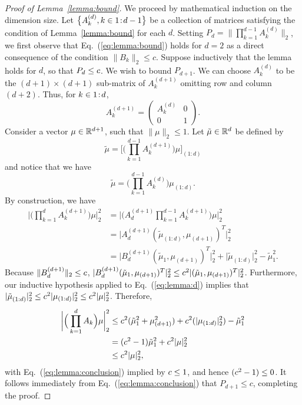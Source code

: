 \documentclass[12pt]{article}\usepackage[]{graphicx}\usepackage[]{xcolor}
\begin{document}
\begin{appendices}
\begin{proof}[Proof of Lemma~\ref{lemma:bound}]
We proceed by mathematical induction on the dimension size.
Let $\big\{A^{(d)}_k, k\in {1}\!:\!{d-1}\big\}$ be a collection of matrices satisfying the condition of Lemma~\ref{lemma:bound} for each $d$.
Setting $P_d=\big\|\prod_{k = 1}^{d-1} A^{(d)}_k \big\|_2$, we first observe that Eq.~(\ref{eq:lemma:bound}) holds for $d=2$ as a direct consequence of the condition $\|B_k\|_2 \leq c$.
Suppose inductively that the lemma holds for $d$, so that $P_d\leq c$.
We wish to bound $P_{d+1}$.
We can choose $A^{(d)}_k$ to be the $(d+1)\times (d+1)$ sub-matrix of $A^{(d+1)}_k$ omitting row and column $(d+2)$.
Thus, for $k\in{1}\!:\!{d}$,
\begin{equation*}
A^{(d+1)}_k =
  \begin{pmatrix}
    A^{(d)}_k & 0 \\
    0 & 1
  \end{pmatrix}.
\end{equation*}
Consider a vector $\mu \in \mathbb{R}^{d+1}$, such that $\|\mu\|_2 \leq 1$.
Let $\tilde{\mu} \in \mathbb{R}^{d}$ be defined by
\begin{equation}
\tilde{\mu} = \bigg[\bigg(\prod_{k = 1}^{d-1} A^{(d+1)}_k\bigg)\mu\bigg]_{(1:d)}
\end{equation}
and notice that we have
\begin{equation}\label{eq:lemma:d}
\tilde{\mu} = \bigg(\prod_{k = 1}^{d-1} A^{(d)}_k\bigg)\mu_{(1:d)}.
\end{equation}
By construction, we have
\begin{align*}
    \bigg|\Big(\prod_{k = 1}^d A^{(d+1)}_k\Big)\mu \bigg|^2_2 &= \bigg|\Big(A^{(d+1)}_d\prod_{k = 1}^{d-1} A^{(d+1)}_k\Big)\mu \bigg|^2_2\\
    &= \big|A^{(d+1)}_d(\tilde{\mu}_{(1:d)}, \mu_{(d+1)})^T\big|^2_2 \\
    &= \big|B^{(d+1)}_d (\tilde{\mu}_1, \mu_{(d+1)})^T\big|^2_2 + \big|\tilde{\mu}_{(1:d)}\big|^2_2 - \tilde{\mu}^2_1.
\end{align*}
Because $\|B^{(d+1)}_d\|_2 \leq c$, $|B^{(d+1)}_d (\tilde{\mu}_1, \mu_{(d+1)})^T|^2_2 \leq c^2|(\tilde{\mu}_1, \mu_{(d+1)})^T|^2_2$.
Furthermore, our inductive hypothesis applied to Eq.~(\ref{eq:lemma:d}) implies that
$|{\tilde{\mu}}_{(1:d)}|^2_2 \leq c^2|\mu_{(1:d)}|^2_2 \leq c^2|\mu|^2_2$.
Therefore,
\begin{align}
    \bigg|\Big(\prod_{k = 1}^d A_k\Big)\mu\bigg|^2_2 &\leq c^2({\tilde{\mu}}^2_1 + \mu_{(d+1)}^2) + c^2(|\mu_{(1:d)}|^2_2) - {\tilde{\mu}}^2_1 \\
    &= (c^2-1){\tilde{\mu}}^2_1 + c^2 |\mu|^2_2
    \\
    \label{eq:lemma:conclusion}
    &\leq c^2 \vert\mu\vert^2_2,
\end{align}
with Eq.~(\ref{eq:lemma:conclusion}) implied by $c \leq 1$, and hence $(c^2-1) \leq 0$.
It follows immediately from Eq.~(\ref{eq:lemma:conclusion}) that $P_{d+1}\le c$, completing the proof.
\end{proof}


\end{appendices}
\end{document}

